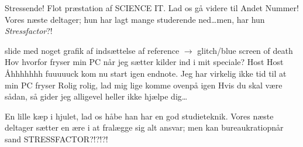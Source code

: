 \documentclass[a4paper,11pt]{article}
\begin{document}
\begin{sketch}

 Stressende! Flot præstation af SCIENCE IT. Lad os gå videre til Andet Nummer! Vores næste deltager; hun har lagt mange studerende ned\ldots men, har hun \textit{Stressfactor}?!


 slide med noget grafik af indsættelse af reference $ \rightarrow $ glitch/blue screen of death
 Hov hvorfor fryser min PC når jeg sætter kilder ind i mit speciale?
 Host Host 
 Åhhhhhhh fuuuuuck kom nu start igen endnote. Jeg har virkelig ikke tid til at min PC fryser
 Rolig rolig, lad mig lige komme ovenpå igen
 Hvis du skal være sådan, så gider jeg alligevel heller ikke hjælpe dig… 


 En lille kæp i hjulet, lad os håbe han har en god studieteknik. Vores næste deltager sætter en ære i at fralægge sig alt ansvar; men kan bureaukratiopnår sand STRESSFACTOR?!?!?!



\end{sketch}
\end{document}

